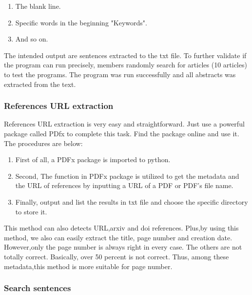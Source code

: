 \begin{enumerate}
	
	\item The blank line.
	\item Specific words in the beginning "Keywords".
	\item And so on.
	
\end{enumerate}

The intended output are sentences extracted to the txt file.
To further validate if the program can run precisely, members randomly search for articles (10 articles) to test the programs.
The program was run successfully and all abstracts was extracted from the text.

\subsubsection{References URL extraction}

References URL extraction is very easy and straightforward.
Just use a powerful package called PDfx to complete this task.
Find the package online and use it.
The procedures are below:

\begin{enumerate}
	
	\item First of all, a PDFx package is imported to python.
	\item Second, The function in PDFx package is utilized to get the metadata and the URL of references by inputting a URL of a PDF or PDF's file name.
	\item Finally, output and list the results in txt file and choose the specific directory to store it.
	
\end{enumerate}

This method can also detects URL,arxiv and doi references.  
Plus,by using this method, we also can easily extract the title, page number and creation date. 
However,only the page number is always right in every case. 
The others are not totally correct. 
Basically, over 50 percent is not correct.
Thus, among these metadata,this method is more suitable for page number. 

\subsubsection{Search sentences}

